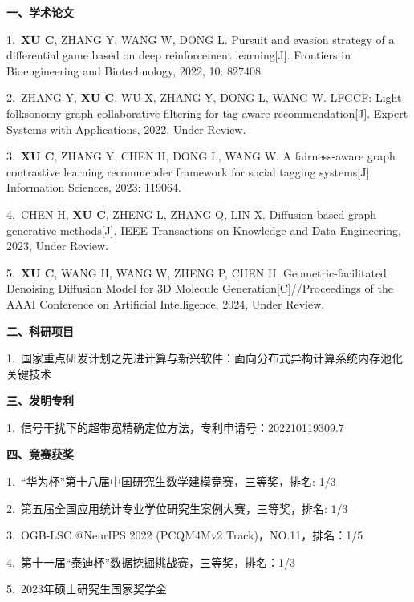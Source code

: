 \cleardoublepage
{}

\noindent {}
\vskip 10pt

\vskip 5pt
\noindent \textbf{一、学术论文}
\vskip 5pt 

1.~\textbf{XU C}, ZHANG Y, WANG W, DONG L. Pursuit and evasion strategy of a differential game based on deep reinforcement learning[J]. Frontiers in Bioengineering and Biotechnology, 2022, 10: 827408.

2.~ZHANG Y, \textbf{XU C}, WU X, ZHANG Y, DONG L, WANG W. LFGCF: Light folksonomy graph collaborative filtering for tag-aware recommendation[J]. Expert Systems with Applications, 2022, Under Review.

3.~\textbf{XU C}, ZHANG Y, CHEN H, DONG L, WANG W. A fairness-aware graph contrastive learning recommender framework for social tagging systems[J]. Information Sciences, 2023: 119064.

4.~CHEN H, \textbf{XU C}, ZHENG L, ZHANG Q, LIN X. Diffusion-based graph generative methods[J]. IEEE Transactions on Knowledge and Data Engineering, 2023, Under Review.

5.~\textbf{XU C}, WANG H, WANG W, ZHENG P, CHEN H. Geometric-facilitated Denoising Diffusion Model for 3D Molecule Generation[C]//Proceedings of the AAAI Conference on Artificial Intelligence, 2024, Under Review.

\vskip 5pt 
\noindent \textbf{二、科研项目}
\vskip 5pt 

1.~国家重点研发计划之先进计算与新兴软件：面向分布式异构计算系统内存池化关键技术




\vskip 5pt 
\noindent \textbf{三、发明专利}
\vskip 5pt 

1.~信号干扰下的超带宽精确定位方法，专利申请号：202210119309.7

\vskip 5pt 
\noindent \textbf{四、竞赛获奖}
\vskip 5pt 

1.~“华为杯”第十八届中国研究生数学建模竞赛，三等奖，排名: 1/3

2.~第五届全国应用统计专业学位研究生案例大赛，三等奖，排名: 1/3

3.~OGB-LSC @NeurIPS 2022 (PCQM4Mv2 Track)，NO.11，排名：1/5

4.~第十一届“泰迪杯”数据挖掘挑战赛，三等奖，排名：1/3

5.~2023年硕士研究生国家奖学金

\newpage